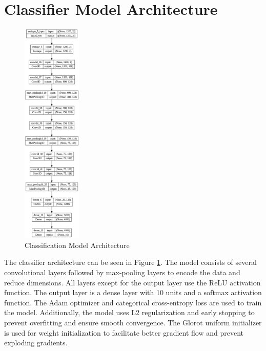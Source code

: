 \section{Classifier Model Architecture}
\begin{figure}[!h]
  \centering
    \includegraphics[width=0.25\textwidth]{figures/model_architecture.png}
    \caption{Classification Model Architecture}
    \label{model_arch}
\end{figure}
The classifier architecture can be seen in Figure \ref{model_arch}. The model consists of several convolutional layers followed by max-pooling layers to encode the data and reduce dimensions. All layers except for the output layer use the ReLU activation function. The output layer is a dense layer with 10 units and a softmax activation function. The Adam optimizer and categorical cross-entropy loss are used to train the model. Additionally, the model uses L2 regularization and early stopping to prevent overfitting and ensure smooth convergence. The Glorot uniform initializer is used for weight initialization to facilitate better gradient flow and prevent exploding gradients. 
